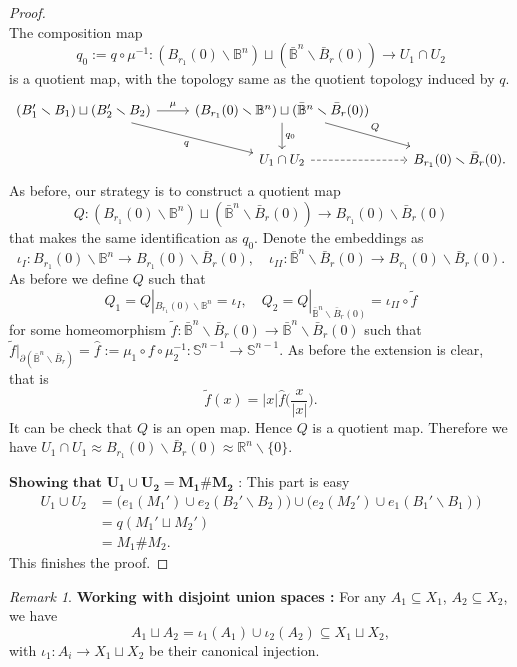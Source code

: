 \documentclass[a4paper]{article}
\theoremstyle{remark}
\newtheorem*{remark}{Remark}
\newcommand{\rn}{\mathbb{R}^n} %
\newcommand{\s}{\mathbb{S}} %
\newcommand{\openball}{\mathbb{B}} %
\newcommand{\closedball}{\bar{\mathbb{B}}} %
\newcommand{\doo}{\partial}    %
\newcommand{\subhim}{\subseteq} %
\begin{document}
\begin{proof}
$$    $$
    The composition map 
    $$
    q_0:=q \circ \mu^{-1} :  (B_{r_1}(0) \smallsetminus \openball^n) \sqcup (\closedball^n \smallsetminus \bar{B}_{r}(0)) \to U_1 \cap U_2
    $$
    is a quotient map, with the topology same as the quotient topology induced by $q$.
    \[
    \begin{tikzcd}
    (B_1'\smallsetminus B_1) \sqcup (B_2'\smallsetminus B_2) \arrow[r,"\mu"] \arrow[dr,"q",swap] &  (B_{r_1}(0) \smallsetminus \openball^n) \sqcup (\closedball^n \smallsetminus \bar{B}_{r}(0)) \arrow[d,,"q_0"] \arrow[dr,"Q"]& \\
    & U_1 \cap U_2 \arrow[r,dashrightarrow] & B_{r_1}(0) \smallsetminus \bar{B}_r(0). 
    \end{tikzcd}
    \]
    As before, our strategy is to construct a quotient map $$
    Q :  (B_{r_1}(0) \smallsetminus \openball^n) \sqcup (\closedball^n \smallsetminus \bar{B}_{r}(0)) \to  B_{r_1}(0) \smallsetminus \bar{B}_r(0)
    $$
    that makes the same identification as $q_0$. Denote the embeddings as
    $$
    \iota_I : B_{r_1}(0) \smallsetminus \openball^n \to B_{r_1}(0) \smallsetminus \bar{B}_r(0),\quad \iota_{II} : \closedball^n \smallsetminus \bar{B}_{r}(0) \to B_{r_1}(0) \smallsetminus \bar{B}_r(0).
    $$
    As before we define $Q$ such that 
    $$
    Q_1 = Q|_{ B_{r_1}(0) \smallsetminus \openball^n} = \iota_I, \quad Q_2=Q|_{\closedball^n \smallsetminus \bar{B}_{r}(0)} = \iota_{II} \circ \widetilde{f}
    $$
    for some homeomorphism $\widetilde{f} : \closedball^n \smallsetminus \bar{B}_{r}(0) \to \closedball^n \smallsetminus \bar{B}_{r}(0)$ such that $\widetilde{f}|_{\doo (\closedball^n \smallsetminus \bar{B}_{r})}  = \hat{f} := \mu_1 \circ f \circ \mu_2^{-1} : \s^{n-1} \to \s^{n-1}$. As before the extension is clear, that is 
    $$
    \widetilde{f} (x) = |x| \hat{f} \Big( \frac{x}{|x|} \Big). 
    $$
    It can be check that $Q$ is an open map. Hence $Q$ is a quotient map. Therefore we have $U_1 \cap U_1 \approx B_{r_1}(0) \smallsetminus \bar{B}_r(0) \approx \rn \smallsetminus \{0\}$. 
    
    $\textbf{Showing that }\mathbf{U_1 \cup U_2 = M_1 \# M_2 }$ : This part is easy
    \begin{align*}
    U_1 \cup U_2 &= \big( e_1(M_1') \cup e_2(B_2'\smallsetminus B_2) \big)\cup \big( e_2(M_2') \cup e_1(B_1' \smallsetminus B_1) \big) \\
    &= q(M_1' \sqcup M_2') \\
    &= M_1 \# M_2. 
    \end{align*}
    This finishes the proof. 
\end{proof}
\begin{remark}
	\textbf{Working with disjoint union spaces : }For any $A_1 \subhim X_1$, $A_2 \subhim X_2$, we have
	$$
	A_1 \sqcup A_2 = \iota_1(A_1) \cup \iota_2(A_2) \subhim X_1 \sqcup X_2,
	$$
	with $\iota_1 : A_i \to X_1\sqcup X_2$ be their canonical injection.
\end{remark}
\end{document}
